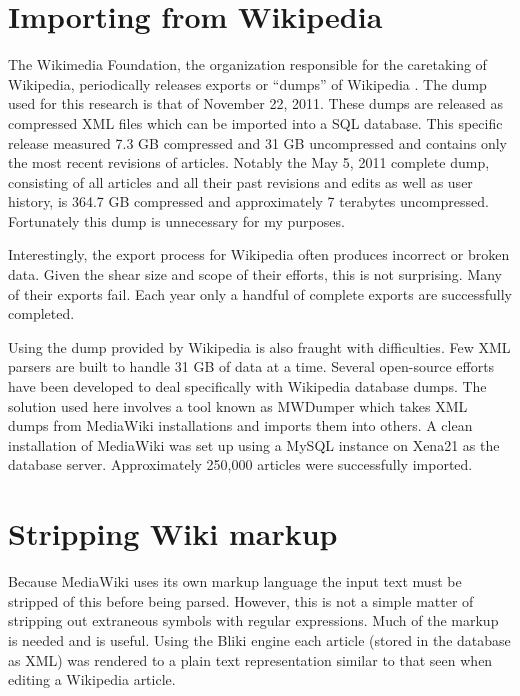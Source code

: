 \section{Importing from Wikipedia}

The Wikimedia Foundation, the organization responsible for the caretaking of Wikipedia, periodically releases exports or ``dumps'' of Wikipedia \cite{wikidump}.  The dump used for this research is that of November 22, 2011.  These dumps are released as compressed XML files which can be imported into a SQL database.  This specific release measured 7.3 GB compressed and 31 GB uncompressed and contains only the most recent revisions of articles. Notably the May 5, 2011 complete dump, consisting of all articles and all their past revisions and edits as well as user history, is 364.7 GB compressed and approximately 7 terabytes uncompressed.  Fortunately this dump is unnecessary for my purposes.

Interestingly, the export process for Wikipedia often produces incorrect or broken data.  Given the shear size and scope of their efforts, this is not surprising.  Many of their exports fail.  Each year only a handful of complete exports are successfully completed.

Using the dump provided by Wikipedia is also fraught with difficulties.  Few XML parsers are built to handle 31 GB of data at a time.  Several open-source efforts have been developed to deal specifically with Wikipedia database dumps.  The solution used here involves a tool known as MWDumper \cite{mwdump} which takes XML dumps from MediaWiki installations and imports them into others.  A clean installation of MediaWiki was set up using a MySQL instance on Xena21 as the database server.  Approximately 250,000 articles were successfully imported.  




\section{Stripping Wiki markup}

Because MediaWiki uses its own markup language the input text must be stripped of this before being parsed.  However, this is not a simple matter of stripping out extraneous symbols with regular expressions.  Much of the markup is needed and is useful.  Using the Bliki engine \cite{bliki} each article (stored in the database as XML) was rendered to a plain text representation similar to that seen when editing a Wikipedia article.  

